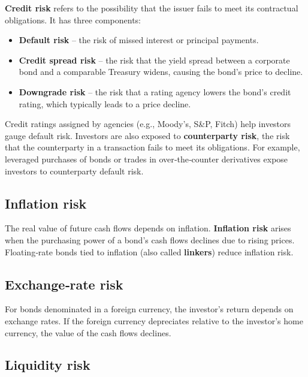 \documentclass[
  letterpaper,
  DIV=11,
  numbers=noendperiod]{scrartcl}
\providecommand{\tightlist}{%
  \setlength{\itemsep}{0pt}\setlength{\parskip}{0pt}}
\begin{document}
\textbf{Credit risk} refers to the possibility that the issuer fails to
meet its contractual obligations. It has three components:

\begin{itemize}
\tightlist
\item
  \textbf{Default risk} -- the risk of missed interest or principal
  payments.\\
\item
  \textbf{Credit spread risk} -- the risk that the yield spread between
  a corporate bond and a comparable Treasury widens, causing the bond's
  price to decline.\\
\item
  \textbf{Downgrade risk} -- the risk that a rating agency lowers the
  bond's credit rating, which typically leads to a price decline.
\end{itemize}

Credit ratings assigned by agencies (e.g., Moody's, S\&P, Fitch) help
investors gauge default risk. Investors are also exposed to
\textbf{counterparty risk}, the risk that the counterparty in a
transaction fails to meet its obligations. For example, leveraged
purchases of bonds or trades in over‑the‑counter derivatives expose
investors to counterparty default risk.

\subsection{Inflation risk}\label{inflation-risk}

The real value of future cash flows depends on inflation.
\textbf{Inflation risk} arises when the purchasing power of a bond's
cash flows declines due to rising prices. Floating‑rate bonds tied to
inflation (also called \textbf{linkers}) reduce inflation risk.

\subsection{Exchange‑rate risk}\label{exchangerate-risk}

For bonds denominated in a foreign currency, the investor's return
depends on exchange rates. If the foreign currency depreciates relative
to the investor's home currency, the value of the cash flows declines.

\subsection{Liquidity risk}\label{liquidity-risk}
\end{document}
